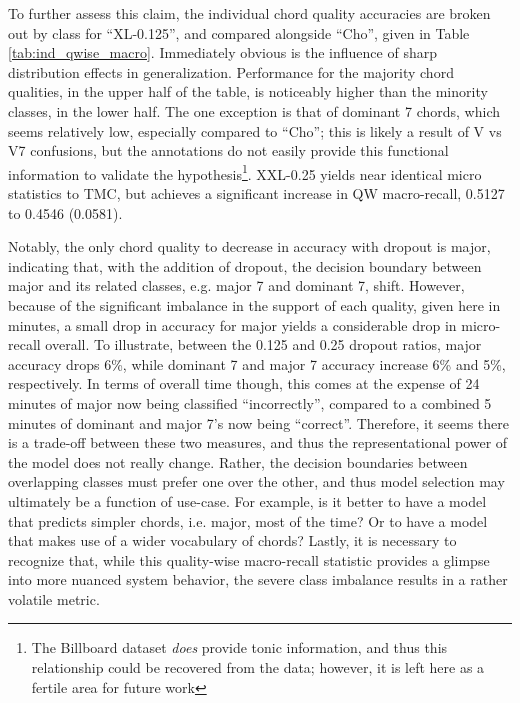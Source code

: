 To further assess this claim, the individual chord quality accuracies are broken out by class for ``XL-0.125'', and compared alongside ``Cho'', given in Table \ref{tab:ind_qwise_macro}.
Immediately obvious is the influence of sharp distribution effects in generalization.
Performance for the majority chord qualities, in the upper half of the table, is noticeably higher than the minority classes, in the lower half.
The one exception is that of dominant 7 chords, which seems relatively low, especially compared to ``Cho'';
this is likely a result of V vs V7 confusions, but the annotations do not easily provide this functional information to validate the hypothesis\footnote{The Billboard dataset \emph{does} provide tonic information, and thus this relationship could be recovered from the data; however, it is left here as a fertile area for future work}.
XXL-0.25 yields near identical micro statistics to TMC, but achieves a significant increase in QW macro-recall, 0.5127 to 0.4546 (0.0581).


Notably, the only chord quality to decrease in accuracy with dropout is major, indicating that, with the addition of dropout, the decision boundary between major and its related classes, e.g. major 7 and dominant 7, shift.
However, because of the significant imbalance in the support of each quality, given here in minutes, a small drop in accuracy for major yields a considerable drop in micro-recall overall.
To illustrate, between the 0.125 and 0.25 dropout ratios, major accuracy drops 6\%, while dominant 7 and major 7 accuracy increase 6\% and 5\%, respectively.
In terms of overall time though, this comes at the expense of 24 minutes of major now being classified ``incorrectly'', compared to a combined 5 minutes of dominant and major 7's now being ``correct''.
Therefore, it seems there is a trade-off between these two measures, and thus the representational power of the model does not really change.
Rather, the decision boundaries between overlapping classes must prefer one over the other, and thus model selection may ultimately be a function of use-case.
For example, is it better to have a model that predicts simpler chords, i.e. major, most of the time? Or to have a model that makes use of a wider vocabulary of chords?
Lastly, it is necessary to recognize that, while this quality-wise macro-recall statistic provides a glimpse into more nuanced system behavior, the severe class imbalance results in a rather volatile metric.


